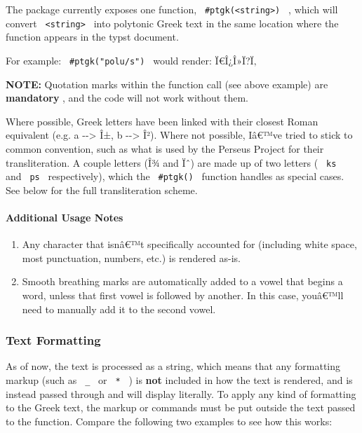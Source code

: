 The package currently exposes one function,
\texttt{\ \#ptgk(\textless{}string\textgreater{})\ } , which will
convert \texttt{\ \textless{}string\textgreater{}\ } into polytonic
Greek text in the same location where the function appears in the typst
document.

For example: \texttt{\ \#ptgk("polu/s")\ } would render: Ï€Î¿Î»Ï?Ï‚

\textbf{NOTE:} Quotation marks within the function call (see above
example) are \textbf{mandatory} , and the code will not work without
them.

Where possible, Greek letters have been linked with their closest Roman
equivalent (e.g. a -\/-\textgreater{} Î±, b -\/-\textgreater{} Î²).
Where not possible, Iâ€™ve tried to stick to common convention, such as
what is used by the Perseus Project for their transliteration. A couple
letters (Î¾ and Ïˆ) are made up of two letters ( \texttt{\ ks\ } and
\texttt{\ ps\ } respectively), which the \texttt{\ \#ptgk()\ } function
handles as special cases. See below for the full transliteration scheme.

\paragraph{Additional Usage Notes}\label{additional-usage-notes}

\begin{enumerate}
\tightlist
\item
  Any character that isnâ€™t specifically accounted for (including white
  space, most punctuation, numbers, etc.) is rendered as-is.
\item
  Smooth breathing marks are automatically added to a vowel that begins
  a word, unless that first vowel is followed by another. In this case,
  youâ€™ll need to manually add it to the second vowel.
\end{enumerate}

\subsubsection{Text Formatting}\label{text-formatting}

As of now, the text is processed as a string, which means that any
formatting markup (such as \texttt{\ \_\ } or \texttt{\ *\ } ) is
\textbf{not} included in how the text is rendered, and is instead passed
through and will display literally. To apply any kind of formatting to
the Greek text, the markup or commands must be put outside the text
passed to the function. Compare the following two examples to see how
this works:

